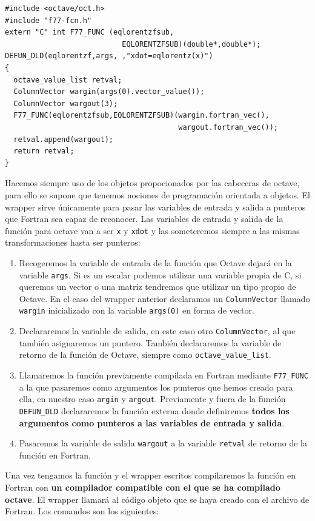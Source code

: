 \begin{verbatim}
#include <octave/oct.h>
#include "f77-fcn.h"
extern "C" int F77_FUNC (eqlorentzfsub,
                           EQLORENTZFSUB)(double*,double*);
DEFUN_DLD(eqlorentzf,args, ,"xdot=eqlorentz(x)")
{
  octave_value_list retval;
  ColumnVector wargin(args(0).vector_value());
  ColumnVector wargout(3);
  F77_FUNC(eqlorentzfsub,EQLORENTZFSUB)(wargin.fortran_vec(),
                                        wargout.fortran_vec());
  retval.append(wargout);
  return retval;
}
\end{verbatim}
Hacemos siempre uso de los objetos propocionados por las cabeceras de
octave, para ello se supone que tenemos nociones de programación
orientada a objetos. El wrapper sirve únicamente para pasar las
variables de entrada y salida a punteros que Fortran sea capaz de
reconocer.  Las variables de entrada y salida de la función para
octave van a ser \texttt{x} y \texttt{xdot} y las someteremos siempre
a las mismas transformaciones hasta ser punteros:

\begin{enumerate}
\item Recogeremos la variable de entrada de la función que Octave
  dejará en la variable \texttt{args}. Si es un escalar podemos
  utilizar una variable propia de C, si queremos un vector o una
  matriz tendremos que utilizar un tipo propio de Octave. En el caso
  del wrapper anterior declaramos un \texttt{ColumnVector} llamado
  \texttt{wargin} inicializado con la variable \texttt{args(0)} en
  forma de vector.
\item Declararemos la variable de salida, en este caso otro
  \texttt{ColumnVector}, al que también asignaremos un puntero.
  También declararemos la variable de retorno de la función de Octave,
  siempre como \texttt{octave\_value\_list}.
\item Llamaremos la función previamente compilada en Fortran mediante
  \texttt{F77\_FUNC} a la que pasaremos como argumentos los punteros
  que hemos creado para ella, en nuestro caso \texttt{argin} y
  \texttt{argout}. Previamente y fuera de la función
  \texttt{DEFUN\_DLD} declararemos la función externa donde
  definiremos \textbf{todos los argumentos como punteros a las
    variables de entrada y salida}.
\item Pasaremos la variable de salida \texttt{wargout} a la variable
  \texttt{retval} de retorno de la función en Fortran.
\end{enumerate}
Una vez tengamos la función y el wrapper escritos compilaremos la
función en Fortran con \textbf{un compilador compatible con el que se
  ha compilado octave}. El wrapper llamará al código objeto que se
haya creado con el archivo de Fortran. Los comandos son los
siguientes:

